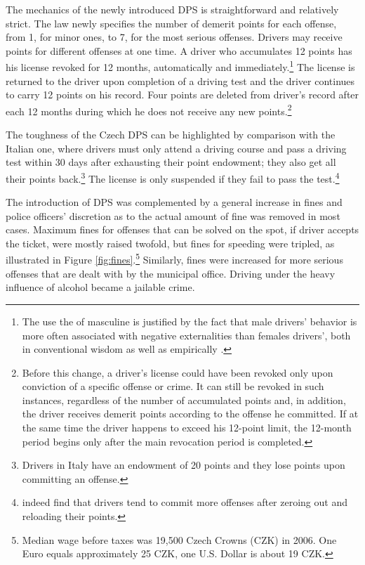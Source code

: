 \documentclass[12pt]{article}
\begin{document}
The mechanics of the newly introduced DPS is straightforward and relatively
strict. The law newly specifies the number of demerit points for each offense,
from 1, for minor ones, to 7, for the most serious offenses. Drivers may receive
points for different offenses at one time. A driver who accumulates 12 points
has his license revoked for 12 months, automatically and
immediately.\footnote{The use the of masculine is justified by the fact that
  male drivers' behavior is more often associated with negative externalities
  than females drivers', both in conventional wisdom as well as empirically
  \autocite{chipman_role_1975,steven_d._levitt_dangerous_2001,redelmeier_traffic-law_2003}.}
The license is returned to the driver upon completion of a driving test and the
driver continues to carry 12 points on his record. Four points are deleted from
driver's record after each 12 months during which he does not receive any new
points.\footnote{Before this change, a driver's license could have been revoked
  only upon conviction of a specific offense or crime.  It can still be revoked
  in such instances, regardless of the number of accumulated points and, in
  addition, the driver receives demerit points according to the offense he
  committed. If at the same time the driver happens to exceed his 12-point
  limit, the 12-month period begins only after the main revocation period is
  completed.} 
  
The toughness of the Czech DPS can be highlighted by comparison with the Italian
one, where drivers must only attend a driving course and pass a driving test
within 30 days after exhausting their point endowment; they also get all their
points back.\footnote{Drivers in Italy have an endowment of 20 points and they
  lose points upon committing an offense.} The license is only suspended if
they fail to pass the test.\footnote{\textcite{nicita_warning_2012} indeed find
  that drivers tend to commit more offenses after zeroing out and reloading
  their points.}

The introduction of DPS was complemented by a general increase in fines and
police officers' discretion as to the actual amount of fine was removed in most
cases.  Maximum fines for offenses that can be solved on the spot, if driver
accepts the ticket, were mostly raised twofold, but fines for speeding were
tripled, as illustrated in Figure \ref{fig:fines}.\footnote{Median wage before
  taxes was 19,500 Czech Crowns (CZK) in 2006. One Euro equals approximately 25
  CZK, one U.S. Dollar is about 19 CZK.} Similarly, fines were increased for 
more serious offenses that are dealt with by the municipal office.  Driving
under the heavy influence of alcohol became a jailable crime.
\end{document}
